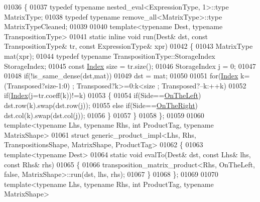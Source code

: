 \begin{DoxyCode}
01036 \{
01037   \textcolor{keyword}{typedef} \textcolor{keyword}{typename} nested\_eval<ExpressionType, 1>::type MatrixType;
01038   \textcolor{keyword}{typedef} \textcolor{keyword}{typename} remove\_all<MatrixType>::type MatrixTypeCleaned;
01039   
01040   \textcolor{keyword}{template}<\textcolor{keyword}{typename} Dest, \textcolor{keyword}{typename} TranspositionType>
01041   \textcolor{keyword}{static} \textcolor{keyword}{inline} \textcolor{keywordtype}{void} run(Dest& dst, \textcolor{keyword}{const} TranspositionType& tr, \textcolor{keyword}{const} ExpressionType& xpr)
01042   \{
01043     MatrixType mat(xpr);
01044     \textcolor{keyword}{typedef} \textcolor{keyword}{typename} TranspositionType::StorageIndex StorageIndex;
01045     \textcolor{keyword}{const} \hyperlink{namespace_eigen_a62e77e0933482dafde8fe197d9a2cfde}{Index} size = tr.size();
01046     StorageIndex j = 0;
01047 
01048     \textcolor{keywordflow}{if}(!is\_same\_dense(dst,mat))
01049       dst = mat;
01050 
01051     \textcolor{keywordflow}{for}(\hyperlink{namespace_eigen_a62e77e0933482dafde8fe197d9a2cfde}{Index} k=(Transposed?size-1:0) ; Transposed?k>=0:k<size ; Transposed?--k:++k)
01052       \textcolor{keywordflow}{if}(\hyperlink{namespace_eigen_a62e77e0933482dafde8fe197d9a2cfde}{Index}(j=tr.coeff(k))!=k)
01053       \{
01054         \textcolor{keywordflow}{if}(Side==\hyperlink{group__enums_ggac22de43beeac7a78b384f99bed5cee0ba129609b3bdf23b071f5f86cf2f995ec4}{OnTheLeft})        dst.row(k).swap(dst.row(j));
01055         \textcolor{keywordflow}{else} \textcolor{keywordflow}{if}(Side==\hyperlink{group__enums_ggac22de43beeac7a78b384f99bed5cee0ba99dc75d8e00b6c3a5bdc31940f47492b}{OnTheRight})  dst.col(k).swap(dst.col(j));
01056       \}
01057   \}
01058 \};
01059 
01060 \textcolor{keyword}{template}<\textcolor{keyword}{typename} Lhs, \textcolor{keyword}{typename} Rhs, \textcolor{keywordtype}{int} ProductTag, \textcolor{keyword}{typename} MatrixShape>
01061 \textcolor{keyword}{struct }generic\_product\_impl<Lhs, Rhs, TranspositionsShape, MatrixShape, ProductTag>
01062 \{
01063   \textcolor{keyword}{template}<\textcolor{keyword}{typename} Dest>
01064   \textcolor{keyword}{static} \textcolor{keywordtype}{void} evalTo(Dest& dst, \textcolor{keyword}{const} Lhs& lhs, \textcolor{keyword}{const} Rhs& rhs)
01065   \{
01066     transposition\_matrix\_product<Rhs, OnTheLeft, false, MatrixShape>::run(dst, lhs, rhs);
01067   \}
01068 \};
01069 
01070 \textcolor{keyword}{template}<\textcolor{keyword}{typename} Lhs, \textcolor{keyword}{typename} Rhs, \textcolor{keywordtype}{int} ProductTag, \textcolor{keyword}{typename} MatrixShape>

\end{DoxyCode}
